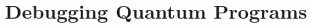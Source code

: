 \documentclass[11pt]{article}
\theoremstyle{plain}
\theoremstyle{definition}
\begin{document}





\section{Debugging Quantum Programs}
\end{document}
